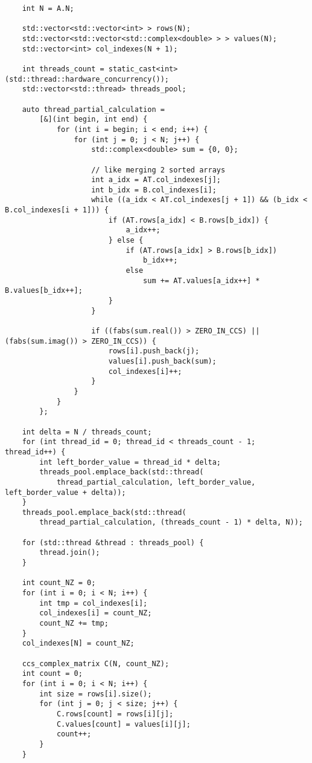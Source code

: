 \documentclass{report}
\begin{document}
\begin{lstlisting}
    int N = A.N;

    std::vector<std::vector<int> > rows(N);
    std::vector<std::vector<std::complex<double> > > values(N);
    std::vector<int> col_indexes(N + 1);

    int threads_count = static_cast<int>(std::thread::hardware_concurrency());
    std::vector<std::thread> threads_pool;

    auto thread_partial_calculation =
        [&](int begin, int end) {
            for (int i = begin; i < end; i++) {
                for (int j = 0; j < N; j++) {
                    std::complex<double> sum = {0, 0};

                    // like merging 2 sorted arrays
                    int a_idx = AT.col_indexes[j];
                    int b_idx = B.col_indexes[i];
                    while ((a_idx < AT.col_indexes[j + 1]) && (b_idx < B.col_indexes[i + 1])) {
                        if (AT.rows[a_idx] < B.rows[b_idx]) {
                            a_idx++;
                        } else {
                            if (AT.rows[a_idx] > B.rows[b_idx])
                                b_idx++;
                            else
                                sum += AT.values[a_idx++] * B.values[b_idx++];
                        }
                    }

                    if ((fabs(sum.real()) > ZERO_IN_CCS) || (fabs(sum.imag()) > ZERO_IN_CCS)) {
                        rows[i].push_back(j);
                        values[i].push_back(sum);
                        col_indexes[i]++;
                    }
                }
            }
        };

    int delta = N / threads_count;
    for (int thread_id = 0; thread_id < threads_count - 1; thread_id++) {
        int left_border_value = thread_id * delta;
        threads_pool.emplace_back(std::thread(
            thread_partial_calculation, left_border_value, left_border_value + delta));
    }
    threads_pool.emplace_back(std::thread(
        thread_partial_calculation, (threads_count - 1) * delta, N));

    for (std::thread &thread : threads_pool) {
        thread.join();
    }

    int count_NZ = 0;
    for (int i = 0; i < N; i++) {
        int tmp = col_indexes[i];
        col_indexes[i] = count_NZ;
        count_NZ += tmp;
    }
    col_indexes[N] = count_NZ;

    ccs_complex_matrix C(N, count_NZ);
    int count = 0;
    for (int i = 0; i < N; i++) {
        int size = rows[i].size();
        for (int j = 0; j < size; j++) {
            C.rows[count] = rows[i][j];
            C.values[count] = values[i][j];
            count++;
        }
    }


\end{lstlisting}
\end{document}
